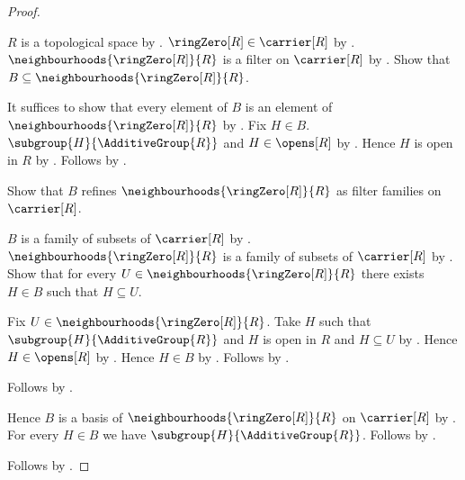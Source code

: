 \begin{proof}
\begin{subproof}
        $R$ is a topological space by
            .
        $\ringZero[R]\in\carrier[R]$ by .
        $\neighbourhoods{\ringZero[R]}{R}$ is a filter on $\carrier[R]$
            by .
        Show that $B\subseteq\neighbourhoods{\ringZero[R]}{R}$.
        \begin{subproof}
            It suffices to show that every element of $B$ is an element of
                $\neighbourhoods{\ringZero[R]}{R}$ by .
            Fix $H\in B$.
            $\subgroup{H}{\AdditiveGroup{R}}$ and $H\in\opens[R]$
                by \auto.
            Hence $H$ is open in $R$ by .
            Follows by
                .
        \end{subproof}
        Show that $B$ refines $\neighbourhoods{\ringZero[R]}{R}$
            as filter families on $\carrier[R]$.
        \begin{subproof}
            $B$ is a family of subsets of $\carrier[R]$ by
                .
            $\neighbourhoods{\ringZero[R]}{R}$ is a family of subsets of
                $\carrier[R]$ by .
            Show that for every $U\in\neighbourhoods{\ringZero[R]}{R}$
                there exists $H\in B$ such that $H\subseteq U$.
            \begin{subproof}
                Fix $U\in\neighbourhoods{\ringZero[R]}{R}$.
                Take $H$ such that $\subgroup{H}{\AdditiveGroup{R}}$ and
                    $H$ is open in $R$ and $H\subseteq U$ by \auto.
                Hence $H\in\opens[R]$ by .
                Hence $H\in B$ by \auto.
                Follows by \auto.
            \end{subproof}
            Follows by .
        \end{subproof}
        Hence $B$ is a basis of
            $\neighbourhoods{\ringZero[R]}{R}$ on $\carrier[R]$ by
            .
        For every $H\in B$ we have
            $\subgroup{H}{\AdditiveGroup{R}}$.
        Follows by
            .
    \end{subproof}
    Follows by \auto.
\end{proof}
